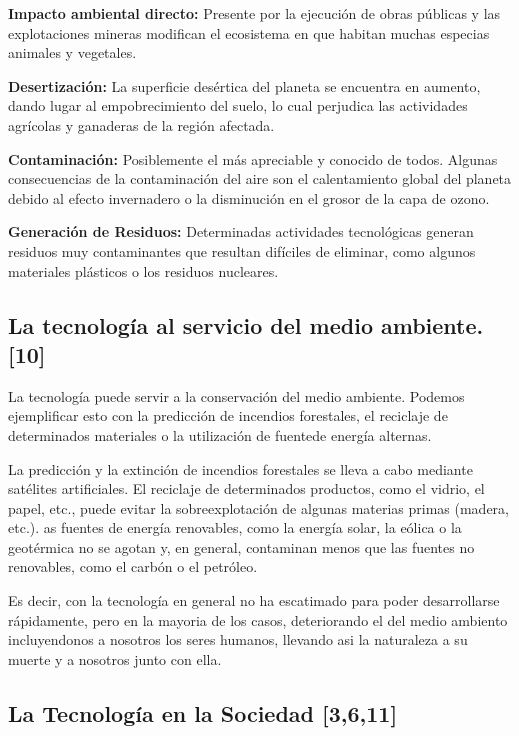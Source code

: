 \documentclass{bmcart}
\begin{document}
\textbf{Impacto ambiental directo:} 
Presente por la ejecución de obras públicas y las explotaciones mineras modifican el ecosistema en que habitan muchas especias animales y vegetales.\smallskip

\textbf{Desertización:} 
 La superficie desértica del planeta se encuentra en aumento, dando lugar al empobrecimiento del suelo, lo cual perjudica las actividades agrícolas y ganaderas de la región afectada.\smallskip
 
 \textbf{Contaminación: }
 Posiblemente el más apreciable y conocido de todos. Algunas consecuencias de la contaminación del aire son el calentamiento global del planeta debido al efecto invernadero o la disminución en el grosor de la capa de ozono.\smallskip
 
 \textbf{Generación de Residuos: }
 Determinadas actividades tecnológicas generan residuos muy contaminantes que resultan difíciles de eliminar, como algunos materiales plásticos o los residuos nucleares.\smallskip
 
 \subsection*{La tecnología al servicio del medio ambiente. [10]}
 
 La tecnología puede servir a la conservación del medio ambiente. Podemos ejemplificar esto con la predicción de incendios forestales, el reciclaje de determinados materiales o la utilización de fuentede energía alternas.\smallskip
 
 La predicción y la extinción de incendios forestales se lleva a cabo mediante satélites artificiales. El reciclaje de determinados productos, como el vidrio, el papel, etc., puede evitar la sobreexplotación de algunas materias primas (madera, etc.). as fuentes de energía renovables, como la energía solar, la eólica o la geotérmica no se agotan y, en general, contaminan menos que las fuentes no renovables, como el carbón o el petróleo.\smallskip
 
 Es decir, con la tecnología en general no ha escatimado para poder desarrollarse rápidamente, pero en la mayoria de los casos, deteriorando el del medio ambiento incluyendonos a nosotros los seres humanos, llevando asi la naturaleza a su muerte y a nosotros junto con ella.\smallskip
 
 \subsection*{La Tecnología en la Sociedad [3,6,11]}
 \smallskip
 
\end{document}
